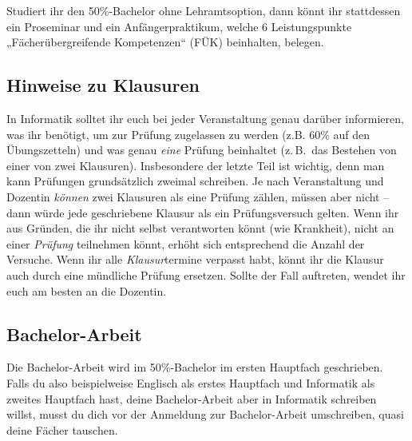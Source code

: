 Studiert ihr den 50\%-Bachelor ohne Lehramtsoption, dann könnt ihr stattdessen ein Proseminar und ein Anfängerpraktikum, welche 6 Leistungspunkte „Fächerübergreifende Kompetenzen“ (FÜK) beinhalten, belegen. 

\subsection{Hinweise zu Klausuren}
In Informatik solltet ihr euch bei jeder Veranstaltung genau darüber informieren, was ihr benötigt, um zur Prüfung zugelassen zu werden (z.B. 60\% auf den Übungszetteln) und was genau \emph{eine} Prüfung beinhaltet (z.\,B.\ das Bestehen von einer von zwei Klausuren). Insbesondere der letzte Teil ist wichtig, denn man kann Prüfungen grundsätzlich zweimal schreiben. Je nach Veranstaltung und Dozentin \emph{können} zwei Klausuren als eine Prüfung zählen, müssen aber nicht -- dann würde jede geschriebene Klausur als ein Prüfungsversuch gelten. Wenn ihr aus Gründen, die ihr nicht selbst verantworten könnt (wie Krankheit), nicht an einer \emph{Prüfung} teilnehmen könnt, erhöht sich entsprechend die Anzahl der Versuche. Wenn ihr alle \emph{Klausur}termine verpasst habt, könnt ihr die Klausur auch durch eine mündliche Prüfung ersetzen. Sollte der Fall auftreten, wendet ihr euch am besten an die Dozentin.

\subsection{Bachelor-Arbeit}
Die Bachelor-Arbeit wird im 50\%-Bachelor im ersten Hauptfach geschrieben. Falls du also beispielweise Englisch als erstes Hauptfach und Informatik als zweites Hauptfach hast, deine Bachelor-Arbeit aber in Informatik schreiben willst, musst du dich vor der Anmeldung zur Bachelor-Arbeit umschreiben, quasi deine Fächer tauschen. 
